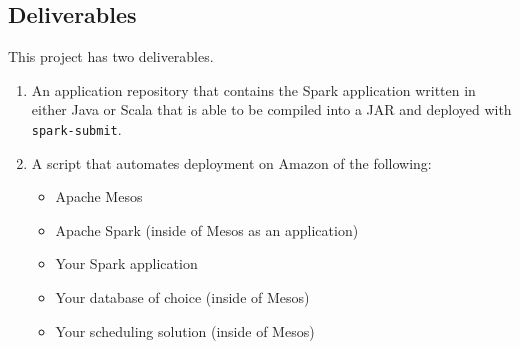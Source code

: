 \documentclass[]{article}
\begin{document}
\subsection{Deliverables}

This project has two deliverables.

\begin{enumerate}
\item An application repository that contains the Spark application written in either Java or Scala that is able to be compiled into a JAR and deployed with \texttt{spark-submit}.
\item A script that automates deployment on Amazon of the following: \begin{itemize}
 \item Apache Mesos
 \item Apache Spark (inside of Mesos as an application)
 \item Your Spark application 
 \item Your database of choice (inside of Mesos)
 \item Your scheduling solution (inside of Mesos)
 \end{itemize}

\end{enumerate}
\end{document}
